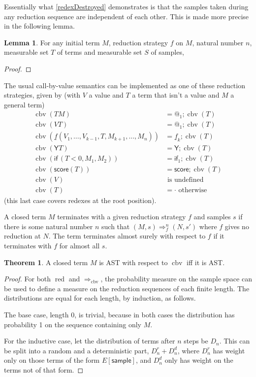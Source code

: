 \documentclass{article}
\newcommand{\tY}{\textsf{Y}}
\newcommand{\tif}[3]{\textsf{if}\,(#1, #2, #3)} %
\newcommand{\tsample}{\textsf{sample}}
\newcommand{\tscore}{\textsf{score}}
\DeclareMathOperator{\red}{red}
\DeclareMathOperator{\cbv}{cbv}
\theoremstyle{definition}
\theoremstyle{lemma}
\newtheorem{lemma}{Lemma}
\newtheorem{theorem}{Theorem}
\theoremstyle{remark}
\begin{document}
Essentially what \ref{redexDestroyed} demonstrates is that the samples taken during any reduction sequence are independent of each other. This is made more precise in the following lemma.

\begin{lemma}
For any initial term $M$, reduction strategy $f$ on $M$, natural number $n$, measurable set $T$ of terms and measurable set $S$ of samples, 
\end{lemma}
\begin{proof}
\end{proof}

The usual call-by-value semantics can be implemented as one of these reduction strategies, given by (with $V$ a value and $T$ a term that isn't a value and $M$ a general term)
\begin{align*}
\cbv(T M) & = @_1 ; \cbv(T) \\
\cbv(V T) & = @_1 ; \cbv(T) \\
\cbv(\underline f(V_1, \dots, V_{k-1}, T, M_{k+1}, \dots, M_n)) & = \underline f_k ; \cbv(T) \\
\cbv(\tY T) & = \tY ; \cbv(T) \\
\cbv(\tif{T < 0}{M_1}{M_2}) & = \textsf{if}_1 ; \cbv(T) \\
\cbv(\tscore(T)) & = \tscore ; \cbv(T) \\
\cbv(V) & \text{ is undefined} \\
\cbv(T) & = \cdot \text{ otherwise}
\end{align*}
(this last case covers redexes at the root position).

A closed term $M$ terminates with a given reduction strategy $f$ and samples $s$ if there is some natural number $n$ such that $(M,s) \Rightarrow_f^n (N,s')$ where $f$ gives no reduction at $N$. The term terminates almost surely with respect to $f$ if it terminates with $f$ for almost all $s$.

\begin{theorem} \label{AstEquivalence}
A closed term $M$ is AST with respect to $\cbv$ iff it is AST.
\end{theorem}
\begin{proof}
For both $\red$ and $\Rightarrow_{\cbv}$, the probability measure on the sample space can be used to define a measure on the reduction sequences of each finite length. The distributions are equal for each length, by induction, as follows.

The base case, length 0, is trivial, because in both cases the distribution has probability 1 on the sequence containing only $M$.

For the inductive case, let the distribution of terms after $n$ steps be $D_n$. This can be split into a random and a deterministic part, $D_n^r + D_n^d$, where $D_n^r$ has weight only on those terms of the form $E[\tsample]$, and $D_n^d$ only has weight on the terms not of that form. 
\end{proof}
\end{document}
